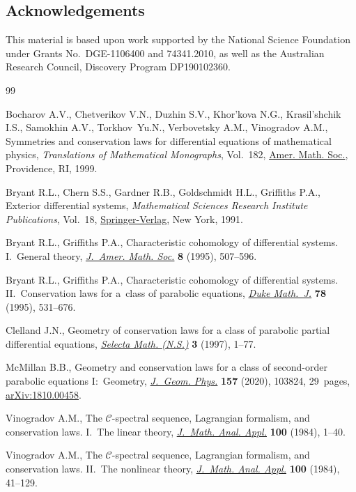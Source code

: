 \documentclass[pdftex]{sigma}
\numberwithin{equation}{section}
\begin{document}
\subsection*{Acknowledgements}
This material is based upon work supported by the National Science Foundation under Grants No.~DGE-1106400 and 74341.2010, as well as the Australian Research Council, Discovery Program DP190102360.

\begin{thebibliography}{99}
\footnotesize\itemsep=0pt

Bocharov A.V., Chetverikov V.N., Duzhin S.V., Khor'kova N.G., Krasil'shchik
 I.S., Samokhin A.V., Tor\-khov~Yu.N., Verbovetsky A.M., Vinogradov A.M.,
 Symmetries and conservation laws for differential equations of mathematical
 physics, \textit{Translations of Mathematical Monographs}, Vol.~182, \href{https://doi.org/10.1090/mmono/182}{Amer.
 Math. Soc.}, Providence, RI, 1999.

Bryant R.L., Chern S.S., Gardner R.B., Goldschmidt H.L., Griffiths P.A.,
 Exterior differential systems, \textit{Mathematical Sciences Research
 Institute Publications}, Vol.~18, \href{https://doi.org/10.1007/978-1-4613-9714-4}{Springer-Verlag}, New York, 1991.

Bryant R.L., Griffiths P.A., Characteristic cohomology of differential systems.
 {I}.~{G}eneral theory, \href{https://doi.org/10.2307/2152923}{\textit{J.~Amer. Math. Soc.}} \textbf{8} (1995),
 507--596.

Bryant R.L., Griffiths P.A., Characteristic cohomology of differential systems.
 {II}.~{C}onservation laws for a~class of parabolic equations, \href{https://doi.org/10.1215/S0012-7094-95-07824-7}{\textit{Duke
 Math.~J.}} \textbf{78} (1995), 531--676.

Clelland J.N., Geometry of conservation laws for a class of parabolic partial
 differential equations, \href{https://doi.org/10.1007/s000290050005}{\textit{Selecta Math. (N.S.)}} \textbf{3} (1997),
 1--77.

McMillan B.B., Geometry and conservation laws for a class of second-order
 parabolic equations {I}:~{G}eometry, \href{https://doi.org/10.1016/j.geomphys.2020.103824}{\textit{J.~Geom. Phys.}} \textbf{157}
 (2020), 103824, 29~pages, \href{https://arxiv.org/abs/1810.00458}{arXiv:1810.00458}.

Vinogradov A.M., The {${\mathcal C}$}-spectral sequence, {L}agrangian
 formalism, and conservation laws. {I}.~{T}he linear theory, \href{https://doi.org/10.1016/0022-247X(84)90071-4}{\textit{J.~Math.
 Anal. Appl.}} \textbf{100} (1984), 1--40.

Vinogradov A.M., The {${\mathcal C}$}-spectral sequence, {L}agrangian
 formalism, and conservation laws. {II}.~{T}he nonlinear theory,
 \href{https://doi.org/10.1016/0022-247X(84)90072-6}{\textit{J.~Math. Anal. Appl.}} \textbf{100} (1984), 41--129.

\end{thebibliography}\LastPageEnding
\end{document}
